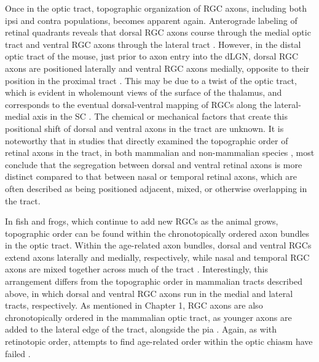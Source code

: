 Once in the optic tract, topographic organization of RGC axons, including both ipsi and contra populations, becomes apparent again.
Anterograde labeling of retinal quadrants reveals that dorsal RGC axons course through the medial optic tract and ventral RGC axons through the lateral tract \cite{chan1999changes,chan1994changes,plas2005pretarget,reese1993reestablishment,reese1990fibre,reh1983organization,torrealba1982studies}.%
However, in the distal optic tract of the mouse, just prior to axon entry into the dLGN, dorsal RGC axons are positioned laterally and ventral RGC axons medially, opposite to their position in the proximal tract \cite{plas2005pretarget}. %
This may be due to a twist of the optic tract, which is evident in wholemount views of the surface of the thalamus, and corresponds to the eventual dorsal-ventral mapping of RGCs along the lateral-medial axis in the SC \cite{plas2005pretarget}.
The chemical or mechanical factors that create this positional shift of dorsal and ventral axons in the tract are unknown.
It is noteworthy that in studies that directly examined the topographic order of retinal axons in the tract, in both mammalian \cite{chan1994changes,plas2005pretarget,reese1993reestablishment} and non-mammalian species \cite{ehrlich1984course,montgomery1998organization,reh1983organization,thanos1983investigations}, most conclude that the segregation between dorsal and ventral retinal axons is more distinct compared to that between nasal or temporal retinal axons, which are often described as being positioned adjacent, mixed, or otherwise overlapping in the tract.

In fish and frogs, which continue to add new RGCs as the animal grows, topographic order can be found within the chronotopically ordered axon bundles in the optic tract.
Within the age-related axon bundles, dorsal and ventral RGCs extend axons laterally and medially, respectively, while nasal and temporal RGC axons are mixed together across much of the tract \cite{reh1983organization}.
Interestingly, this arrangement differs from the topographic order in mammalian tracts described above, in which dorsal and ventral RGC axons run in the medial and lateral tracts, respectively.
As mentioned in Chapter 1, RGC axons are also chronotopically ordered in the mammalian optic tract, as younger axons are added to the lateral edge of the tract, alongside the pia \cite{colello1992observations,reese1987distributionrat,reese1990fibre,reese1997chronotopic,walsh1985age}. %
Again, as with retinotopic order, attempts to find age-related order within the optic chiasm have failed \cite{colello1998changing}.
